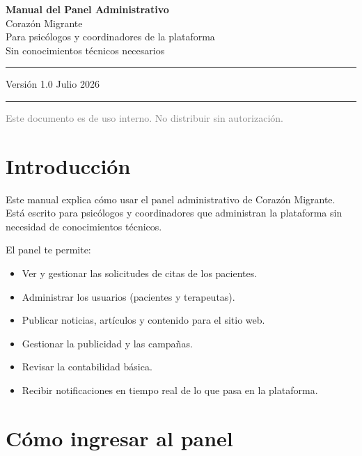 \documentclass[12pt,a4paper]{article}
\begin{document}
\begin{titlepage}
  \centering
  \vspace*{3cm}
  {\huge\bfseries\color{primaryColor} Manual del Panel Administrativo\\[0.5em]}
  {\large Corazón Migrante\\[2em]}
  {\normalsize Para psicólogos y coordinadores de la plataforma\\[0.3em]}
  {\small Sin conocimientos técnicos necesarios\\[4cm]}
  \hrule
  \vspace{0.5em}
  {\small Versión 1.0 \textperiodcentered{} Julio 2026}
  \vspace{0.5em}
  \hrule
  \vfill
  {\footnotesize\textcolor{grayText}{Este documento es de uso interno. No distribuir sin autorización.}}
\end{titlepage}

\tableofcontents
\newpage

\section{Introducción}

Este manual explica cómo usar el panel administrativo de Corazón Migrante.
Está escrito para psicólogos y coordinadores que administran la plataforma sin
necesidad de conocimientos técnicos.

El panel te permite:
\begin{itemize}
  \item Ver y gestionar las solicitudes de citas de los pacientes.
  \item Administrar los usuarios (pacientes y terapeutas).
  \item Publicar noticias, artículos y contenido para el sitio web.
  \item Gestionar la publicidad y las campañas.
  \item Revisar la contabilidad básica.
  \item Recibir notificaciones en tiempo real de lo que pasa en la plataforma.
\end{itemize}

\section{Cómo ingresar al panel}
\end{document}
